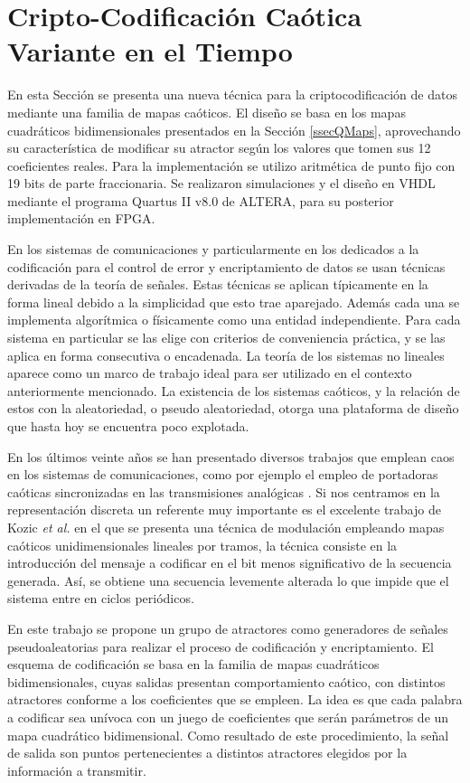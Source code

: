 \section{Cripto-Codificación Caótica Variante en el Tiempo}
\label{sec:CodCaot}

En esta Sección se presenta una nueva técnica para la criptocodificación de datos mediante una familia de mapas caóticos.
El diseño se basa en los mapas cuadráticos bidimensionales presentados en la Sección \ref{ssecQMaps}, aprovechando su característica de modificar su atractor según los valores que tomen sus 12 coeficientes reales.
Para la implementación se utilizo aritmética de punto fijo con 19 bits de parte fraccionaria.
Se realizaron simulaciones y el diseño en VHDL mediante el programa Quartus II v8.0 de ALTERA, para su posterior implementación en FPGA.

En los sistemas de comunicaciones y particularmente en los dedicados a la codificación para el control de error y encriptamiento de datos se usan técnicas derivadas de la teoría de señales.
Estas técnicas se aplican típicamente en la forma lineal debido a la simplicidad que esto trae aparejado.
Además cada una se implementa algorítmica o físicamente como una entidad independiente.
Para cada sistema en particular se las elige con criterios de conveniencia práctica, y se las aplica en forma consecutiva o encadenada.
La teoría de los sistemas no lineales \cite{Strotgartz1994,Lasota1994} aparece como un marco de trabajo ideal para ser utilizado en el contexto anteriormente mencionado.
La existencia de los sistemas caóticos, y la relación de estos con la aleatoriedad, o pseudo aleatoriedad, otorga una plataforma de diseño que hasta hoy se encuentra poco explotada.

En los últimos veinte años se han presentado diversos trabajos que emplean caos en los sistemas de comunicaciones, como por ejemplo el empleo de portadoras caóticas sincronizadas en las transmisiones analógicas \cite{Kocarev1995,Hidalgo2001}.
Si nos centramos en la representación discreta un referente muy importante es el excelente trabajo de Kozic \textit{et al.} \cite{Kozic2006A,Kozic2006B} en el que se presenta una técnica de modulación empleando mapas caóticos unidimensionales lineales por tramos, la técnica consiste en la introducción del mensaje a codificar en el bit menos significativo de la secuencia generada.
Así, se obtiene una secuencia levemente alterada lo que impide que el sistema entre en ciclos periódicos.

En este trabajo se propone un grupo de atractores como generadores de señales pseudoaleatorias para realizar el proceso de codificación y encriptamiento.
El esquema de codificación se basa en la familia de mapas cuadráticos bidimensionales, cuyas salidas presentan comportamiento caótico, con distintos atractores conforme a los coeficientes que se empleen.
La idea es que cada palabra a codificar sea unívoca con un juego de coeficientes que serán parámetros de un mapa cuadrático bidimensional.
Como resultado de este procedimiento, la señal de salida son puntos pertenecientes a distintos atractores elegidos por la información a transmitir.

